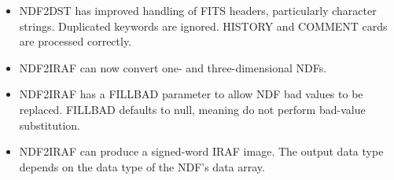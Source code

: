 \begin{itemize}
  \item NDF2DST has improved handling of FITS headers, particularly
        character strings.  Duplicated keywords are ignored.  HISTORY
        and COMMENT cards are processed correctly.

  \item NDF2IRAF can now convert one- and three-dimensional NDFs.

  \item NDF2IRAF has a FILLBAD parameter to allow NDF bad values to
        be replaced.  FILLBAD defaults to null, meaning do not perform
        bad-value substitution.

  \item NDF2IRAF can produce a signed-word IRAF image.  The output data
        type depends on the data type of the NDF's data array.

\end{itemize}


